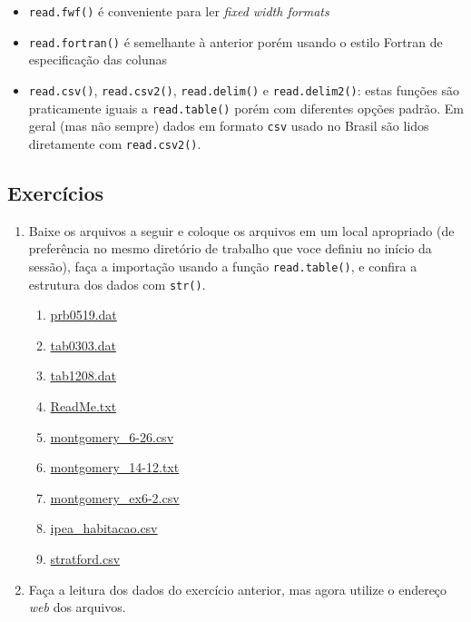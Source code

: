 \documentclass[10pt,a4paper]{book}
\providecommand{\tightlist}{%
  \setlength{\itemsep}{0pt}\setlength{\parskip}{0pt}}
\begin{document}
\begin{itemize}
\tightlist
\item
  \texttt{read.fwf()} é conveniente para ler \emph{fixed width formats}
\item
  \texttt{read.fortran()} é semelhante à anterior porém usando o estilo
  Fortran de especificação das colunas
\item
  \texttt{read.csv()}, \texttt{read.csv2()}, \texttt{read.delim()} e
  \texttt{read.delim2()}: estas funções são praticamente iguais a
  \texttt{read.table()} porém com diferentes opções padrão. Em geral
  (mas não sempre) dados em formato \texttt{csv} usado no Brasil são
  lidos diretamente com \texttt{read.csv2()}.
\end{itemize}

\subsection*{Exercícios}\label{exercicios-10}


\begin{enumerate}
\def\labelenumi{\arabic{enumi}.}
\tightlist
\item
  Baixe os arquivos a seguir e coloque os arquivos em um local
  apropriado (de preferência no mesmo diretório de trabalho que voce
  definiu no início da sessão), faça a importação usando a função
  \texttt{read.table()}, e confira a estrutura dos dados com
  \texttt{str()}.

  \begin{enumerate}
  \def\labelenumii{\alph{enumii}.}
  \tightlist
  \item
    \href{http://leg.ufpr.br/~fernandomayer/data/BHH2/prb0519.dat}{prb0519.dat}
  \item
    \href{http://leg.ufpr.br/~fernandomayer/data/BHH2/tab0303.dat}{tab0303.dat}
  \item
    \href{http://leg.ufpr.br/~fernandomayer/data/BHH2/tab1208.dat}{tab1208.dat}
  \item
    \href{http://leg.ufpr.br/~fernandomayer/data/BHH2/ReadMe.txt}{ReadMe.txt}
  \item
    \href{http://leg.ufpr.br/~fernandomayer/data/montgomery_6-26.csv}{montgomery\_6-26.csv}
  \item
    \href{http://leg.ufpr.br/~fernandomayer/data/montgomery_14-12.txt}{montgomery\_14-12.txt}
  \item
    \href{http://leg.ufpr.br/~fernandomayer/data/montgomery_ex6-2.csv}{montgomery\_ex6-2.csv}
  \item
    \href{http://www.leg.ufpr.br/~fernandomayer/data/ipea_habitacao.csv}{ipea\_habitacao.csv}
  \item
    \href{http://www.leg.ufpr.br/~fernandomayer/data/stratford.csv}{stratford.csv}
  \end{enumerate}
\item
  Faça a leitura dos dados do exercício anterior, mas agora utilize o
  endereço \emph{web} dos arquivos.
\end{enumerate}
\end{document}

